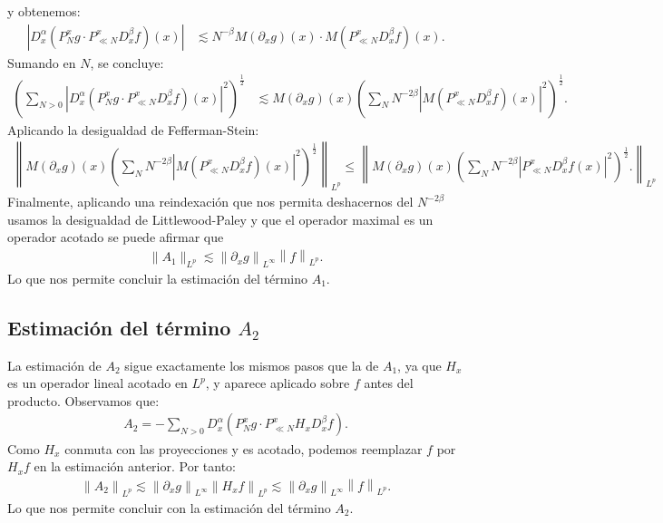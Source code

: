 \documentclass{aleph-revista}
\providecommand{\norm}[1]{\left\|#1\right\|}
\begin{document}
  y obtenemos:
  \begin{align*}
    |D_x^\alpha (P_N^x g \cdot P_{\ll N}^x D_x^\beta f)(x)|&\lesssim N^{-\beta} M(\partial_x g)(x) \cdot M(P_{\ll N}^x D_x^\beta f)(x).
  \end{align*}
  Sumando en $N$, se concluye:
  \begin{align*}
    \left(\sum_{N>0}|D_x^\alpha (P_N^x g \cdot P_{\ll N}^x D_x^\beta f)(x)|^{2}\right)^{\frac{1}{2}}&\lesssim  M(\partial_x g)(x)\left(\sum_{N}N^{-2\beta}|M(P_{\ll N}^x D_x^\beta f)(x)|^{2}\right)^{\frac{1}{2}}.
  \end{align*}
  Aplicando la desigualdad de Fefferman-Stein:
  \begin{align*}
    \norm{M(\partial_x g)(x)\left(\sum_{N}N^{-2\beta}|M(P_{\ll N}^x D_x^\beta f)(x)|^{2}\right)^{\frac{1}{2}}}_{L^{p}}\leq \norm{M(\partial_x g)(x)\left(\sum_{N}N^{-2\beta}|P_{\ll N}^x D_x^\beta f(x)|^{2}\right)^{\frac{1}{2}}.}_{L^p}
  \end{align*}
  Finalmente, aplicando una reindexación que nos permita deshacernos del $N^{-2\beta}$ usamos la desigualdad de Littlewood-Paley y que el operador maximal es un operador acotado se puede afirmar que
  \begin{align*}
    \|A_1\|_{L^p} \lesssim \norm{\partial_x g}_{L^\infty} \norm{f}_{L^p}.   
  \end{align*}
  Lo que nos permite concluir la estimación del término $A_1$.
  
\subsection*{Estimación del término $A_2$}
  La estimación de $A_2$ sigue exactamente los mismos pasos que la de $A_1$, ya que $H_x$ es un operador lineal acotado en $L^p$, y aparece aplicado sobre $f$ antes del producto. Observamos que:
  \begin{align*}
    A_2 = - \sum_{N > 0} D_x^\alpha (P_N^x g \cdot P_{\ll N}^x H_x D_x^\beta f).
  \end{align*}
  Como $H_x$ conmuta con las proyecciones y es acotado, podemos reemplazar $f$ por $H_x f$ en la estimación anterior. Por tanto:
  \begin{align*}
    \norm{A_2}_{L^p} \lesssim \norm{\partial_x g}_{L^\infty} \norm{H_x f}_{L^p} \lesssim \norm{\partial_x g}_{L^\infty}\norm{f}_{L^p}.   
  \end{align*}
  Lo que nos permite concluir con la estimación del término $A_2$.
\end{document}

